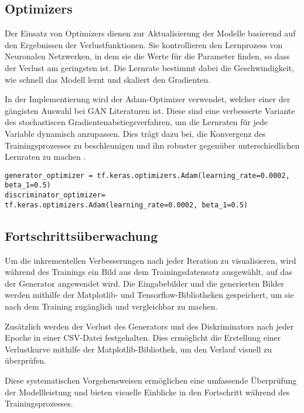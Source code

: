 \subsection{Optimizers}
Der Einsatz von Optimizers dienen zur Aktualisierung der Modelle basierend auf den Ergebnissen der Verlustfunktionen. Sie kontrollieren den Lernprozess von Neuronalen Netzwerken, in dem sie die Werte für die Parameter finden, so dass der Verlust am geringsten ist. Die Lernrate bestimmt dabei die Geschwindigkeit, wie schnell das Modell lernt und skaliert den Gradienten. 

In der Implementierung wird der Adam-Optimizer verwendet, welcher einer der gängisten Auswahl bei GAN Literaturen ist. Diese sind eine verbesserte Variante des stochastiscen Gradientenabstiegsverfahren, um die Lernraten für jede Variable dynamisch anzupassen. Dies trägt dazu bei, die Konvergenz des Trainingsprozesses zu beschleunigen und ihn robuster gegenüber unterschiedlichen Lernraten zu machen \cite{Kingma.2014}. 

\begin{lstlisting}[language=pyhaff, caption={Initialisierung der Adam-Optimizers aus Pix2Pix Implementierung}, label={cod:optimizer}]
generator_optimizer = tf.keras.optimizers.Adam(learning_rate=0.0002, beta_1=0.5)
discriminator_optimizer= tf.keras.optimizers.Adam(learning_rate=0.0002, beta_1=0.5)
\end{lstlisting}

\subsection{Fortschrittsüberwachung}
Um die inkrementellen Verbesserungen nach jeder Iteration zu visualisieren, wird während des Trainings ein Bild aus dem Trainingsdatensatz ausgewählt, auf das der Generator angewendet wird. Die Eingabebilder und die generierten Bilder werden mithilfe der Matplotlib- und Tensorflow-Bibliotheken gespeichert, um sie nach dem Training zugänglich und vergleichbar zu machen.

Zusätzlich werden der Verlust des Generators und des Diskriminators nach jeder Epoche in einer CSV-Datei festgehalten. Dies ermöglicht die Erstellung einer Verlustkurve mithilfe der Matplotlib-Bibliothek, um den Verlauf visuell zu überprüfen.

Diese systematischen Vorgehensweisen ermöglichen eine umfassende Überprüfung der Modellleistung und bieten visuelle Einblicke in den Fortschritt während des Trainingsprozesses.